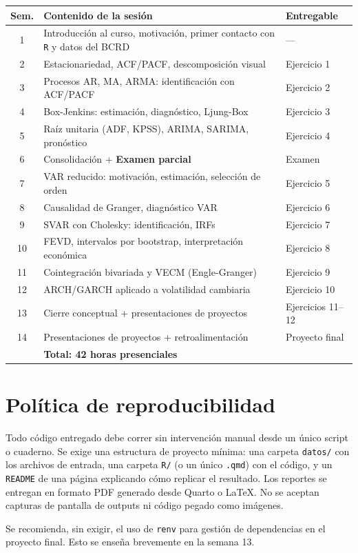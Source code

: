 \documentclass[11pt,letterpaper]{article}
\begin{document}
\begin{center}
\small
\begin{tabular}{@{}c p{7.5cm} p{4.5cm}@{}}
\toprule
\textbf{Sem.} & \textbf{Contenido de la sesión} & \textbf{Entregable} \\
\midrule
1 & Introducción al curso, motivación, primer contacto con \texttt{R} y datos del BCRD & --- \\
2 & Estacionariedad, ACF/PACF, descomposición visual & Ejercicio 1 \\
3 & Procesos AR, MA, ARMA: identificación con ACF/PACF & Ejercicio 2 \\
4 & Box-Jenkins: estimación, diagnóstico, Ljung-Box & Ejercicio 3 \\
5 & Raíz unitaria (ADF, KPSS), ARIMA, SARIMA, pronóstico & Ejercicio 4 \\
6 & Consolidación + \textbf{Examen parcial} & Examen \\
7 & VAR reducido: motivación, estimación, selección de orden & Ejercicio 5 \\
8 & Causalidad de Granger, diagnóstico VAR & Ejercicio 6 \\
9 & SVAR con Cholesky: identificación, IRFs & Ejercicio 7 \\
10 & FEVD, intervalos por bootstrap, interpretación económica & Ejercicio 8 \\
11 & Cointegración bivariada y VECM (Engle-Granger) & Ejercicio 9 \\
12 & ARCH/GARCH aplicado a volatilidad cambiaria & Ejercicio 10 \\
13 & Cierre conceptual + presentaciones de proyectos & Ejercicios 11--12 \\
14 & Presentaciones de proyectos + retroalimentación & Proyecto final \\
\midrule
 & \textbf{Total: 42 horas presenciales} & \\
\bottomrule
\end{tabular}
\end{center}

\section{Política de reproducibilidad}

Todo código entregado debe correr sin intervención manual desde un único script o cuaderno. Se exige una estructura de proyecto mínima: una carpeta \texttt{datos/} con los archivos de entrada, una carpeta \texttt{R/} (o un único \texttt{.qmd}) con el código, y un \texttt{README} de una página explicando cómo replicar el resultado. Los reportes se entregan en formato PDF generado desde Quarto o LaTeX. No se aceptan capturas de pantalla de outputs ni código pegado como imágenes.

Se recomienda, sin exigir, el uso de \texttt{renv} para gestión de dependencias en el proyecto final. Esto se enseña brevemente en la semana 13.
\end{document}
